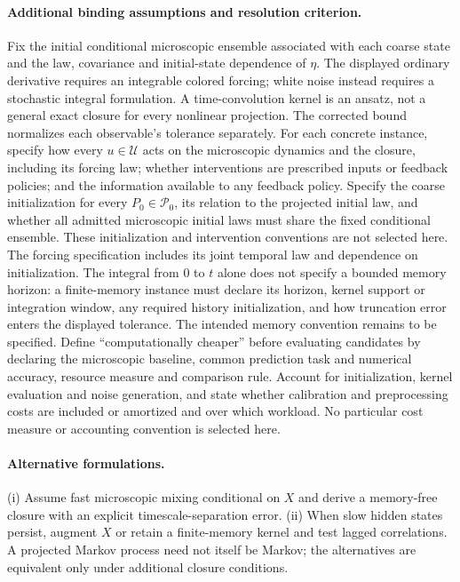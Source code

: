\documentclass[11pt]{article}
\begin{document}
\paragraph{Additional binding assumptions and resolution criterion.} Fix the initial conditional microscopic ensemble associated with each coarse state and the law, covariance and initial-state dependence of $\eta$. The displayed ordinary derivative requires an integrable colored forcing; white noise instead requires a stochastic integral formulation. A time-convolution kernel is an ansatz, not a general exact closure for every nonlinear projection. The corrected bound normalizes each observable's tolerance separately.
For each concrete instance, specify how every $u\in\mathcal U$ acts on the microscopic dynamics and the closure, including its forcing law; whether interventions are prescribed inputs or feedback policies; and the information available to any feedback policy. Specify the coarse initialization for every $P_0\in\mathcal P_0$, its relation to the projected initial law, and whether all admitted microscopic initial laws must share the fixed conditional ensemble. These initialization and intervention conventions are not selected here. The forcing specification includes its joint temporal law and dependence on initialization. The integral from $0$ to $t$ alone does not specify a bounded memory horizon: a finite-memory instance must declare its horizon, kernel support or integration window, any required history initialization, and how truncation error enters the displayed tolerance. The intended memory convention remains to be specified. Define ``computationally cheaper'' before evaluating candidates by declaring the microscopic baseline, common prediction task and numerical accuracy, resource measure and comparison rule. Account for initialization, kernel evaluation and noise generation, and state whether calibration and preprocessing costs are included or amortized and over which workload. No particular cost measure or accounting convention is selected here.

\paragraph{Alternative formulations.} (i) Assume fast microscopic mixing conditional on $X$ and derive a memory-free closure with an explicit timescale-separation error. (ii) When slow hidden states persist, augment $X$ or retain a finite-memory kernel and test lagged correlations. A projected Markov process need not itself be Markov; the alternatives are equivalent only under additional closure conditions.
\end{document}
